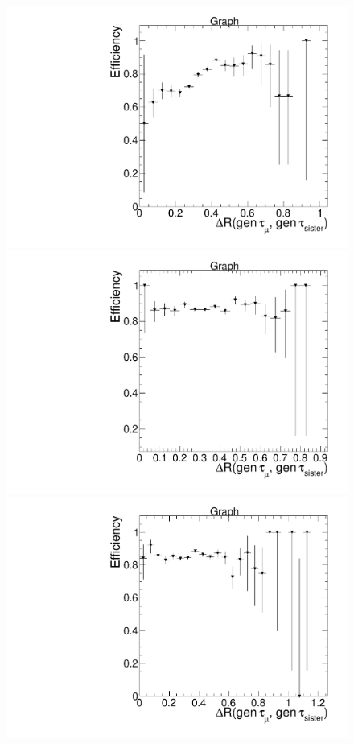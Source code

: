 \begin{figure}[hbtp]
  \begin{center}
    \includegraphics[width=0.8\cmsFigWidth]{figures/dRHLTEfficiency_WmuIDIso_withFilters_muEOnly}
    \includegraphics[width=0.8\cmsFigWidth]{figures/dRHLTEfficiency_WmuIDIso_withFilters_muMuOnly}
    \includegraphics[width=0.8\cmsFigWidth]{figures/dRHLTEfficiency_WmuIDIso_withFilters_muHadOnly}

\end{center}
\end{figure}
